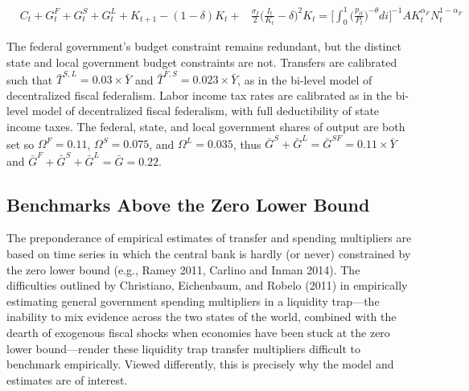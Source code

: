 \documentclass[12pt,letterpaper]{article}
\begin{document}
\begin{align}
& C_{t} + G^F_{t} + G^S_{t} + G^L_{t} + K_{t+1} - (1-\delta)K_t +  &\frac{\sigma_I}{2} \Big(\frac{I_t}{K_t} - \delta \Big)^2 K_t = \Big[ \int_0^1  \Big( \frac{p_{it}}{P_t} \Big) ^{-\theta} di \Big]^{-1} A K_t ^{\alpha_F} N_t ^{1-\alpha_F}
\end{align}

The federal government's budget constraint remains redundant, but the distinct state and local government budget constraints are not. Transfers are calibrated such that $\bar{T}^{S,L} = 0.03 \times \bar{Y}$ and $\bar{T}^{F,S} = 0.023 \times \bar{Y} $, as in the bi-level model of decentralized fiscal federalism. Labor income tax rates are calibrated as in the bi-level model of decentralized fiscal federalism, with full deductibility of state income taxes. The federal, state, and local government shares of output are both set so $\Omega^F =  0.11$, $\Omega^S = 0.075 $, and $\Omega^L = 0.035$, thus $\bar{G}^S + \bar{G}^L = \bar{G}^{SF}  = 0.11 \times \bar{Y}$ and $\bar{G}^F + \bar{G}^S + \bar{G}^L = \bar{G} = 0.22$. 

\subsection{Benchmarks Above the Zero Lower Bound}

The preponderance of empirical estimates of transfer and spending multipliers are based on time series in which the central bank is hardly (or never) constrained by the zero lower bound (e.g., Ramey 2011, Carlino and Inman 2014). The difficulties outlined by Christiano, Eichenbaum, and Robelo (2011) in empirically estimating general government spending multipliers in a liquidity trap---the inability to mix evidence across the two states of the world, combined with the dearth of exogenous fiscal shocks when economies have been stuck at the zero lower bound---render these liquidity trap transfer multipliers difficult to benchmark empirically. Viewed differently, this is precisely why the model and estimates are of interest. 
\end{document}
